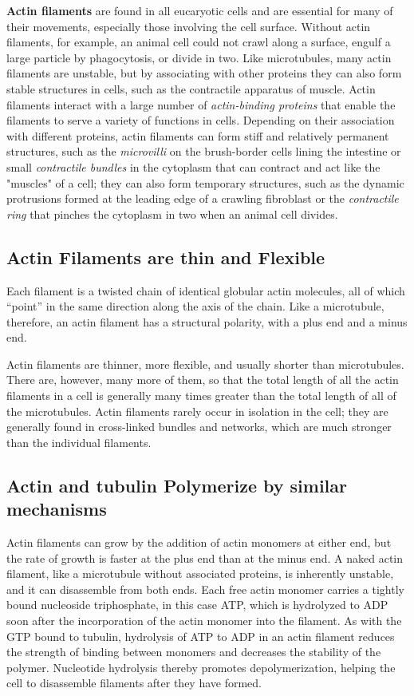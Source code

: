 \textbf{Actin filaments} are found in all eucaryotic cells and are essential for
many of their movements, especially those involving the cell surface.
Without actin filaments, for example, an animal cell could not crawl
along a surface, engulf a large particle by phagocytosis, or divide in two.
Like microtubules, many actin filaments are unstable, but by associating
with other proteins they can also form stable structures in cells, such as
the contractile apparatus of muscle. Actin filaments interact with a large
number of \textit{actin-binding proteins} that enable the filaments to serve a variety
of functions in cells. Depending on their association with different
proteins, actin filaments can form stiff and relatively permanent structures,
such as the \textit{microvilli} on the brush-border cells lining the intestine
or small \textit{contractile bundles} in the cytoplasm that can
contract and act like the "muscles" of a cell; they can also
form temporary structures, such as the dynamic protrusions formed at
the leading edge of a crawling fibroblast or the \textit{contractile
ring} that pinches the cytoplasm in two when an animal cell divides.

\subsection{Actin Filaments are thin and Flexible}

Each filament is a twisted chain of identical globular actin
molecules, all of which “point” in the same direction along the axis of the
chain. Like a microtubule, therefore, an actin filament has a structural
polarity, with a plus end and a minus end.

Actin filaments are thinner, more flexible, and usually shorter than microtubules.
There are, however, many more of them, so that the total length
of all the actin filaments in a cell is generally many times greater than
the total length of all of the microtubules. Actin filaments rarely occur in
isolation in the cell; they are generally found in cross-linked bundles and
networks, which are much stronger than the individual filaments.

\subsection{Actin and tubulin Polymerize by similar mechanisms}

Actin filaments can grow by the addition of actin monomers at either end,
but the rate of growth is faster at the plus end than at the minus end. A
naked actin filament, like a microtubule without associated proteins, is
inherently unstable, and it can disassemble from both ends. Each free
actin monomer carries a tightly bound nucleoside triphosphate, in this
case ATP, which is hydrolyzed to ADP soon after the incorporation of
the actin monomer into the filament. As with the GTP bound to tubulin,
hydrolysis of ATP to ADP in an actin filament reduces the strength of
binding between monomers and decreases the stability of the polymer.
Nucleotide hydrolysis thereby promotes depolymerization, helping the
cell to disassemble filaments after they have formed.


